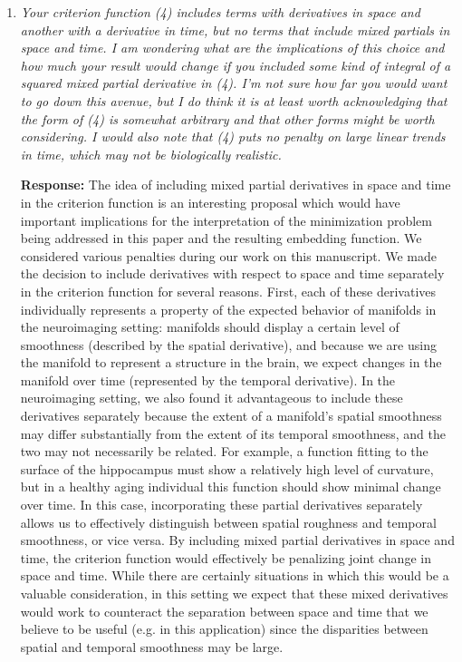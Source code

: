 \documentclass[12pt]{article}
\theoremstyle{definition}
\begin{document}
\begin{enumerate}
\item {\it Your criterion function (4) includes terms with derivatives in space and another with a derivative in time, but no terms that include mixed partials in space and time.  I am wondering what are the implications of this choice and how much your result would change if you included some kind of integral of a squared mixed partial derivative in (4).  I'm not sure how far you would want to go down this avenue, but I do think it is at least worth acknowledging that the form of (4) is somewhat arbitrary and that other forms might be worth considering.  I would also note that (4) puts no penalty on large linear trends in time, which may not be biologically realistic.}

{\bf Response:} The idea of including mixed partial derivatives in space and time in the criterion function is an interesting proposal which would have important implications for the interpretation of the minimization problem being addressed in this paper and the resulting embedding function. We considered various penalties during our work on this manuscript. We made the decision to include derivatives with respect to space and time separately in the criterion function for several reasons. First, each of these derivatives individually represents a property of the expected behavior of manifolds in the neuroimaging setting: manifolds should display a certain level of smoothness (described by the spatial derivative), and because we are using the manifold to represent a structure in the brain, we expect changes in the manifold over time (represented by the temporal derivative). In the neuroimaging setting, we also found it advantageous to include these derivatives separately because the extent of a manifold's spatial smoothness may differ substantially from the extent of its temporal smoothness, and the two may not necessarily be related. For example, a function fitting to the surface of the hippocampus must show a relatively high level of curvature, but in a healthy aging individual this function should show minimal change over time. In this case, incorporating these partial derivatives separately allows us to effectively distinguish between spatial roughness and temporal smoothness, or vice versa. By including mixed partial derivatives in space and time, the criterion function would effectively be penalizing joint change in space and time. While there are certainly situations in which this would be a valuable consideration, in this setting we expect that these mixed derivatives would work to counteract the separation between space and time that we believe to be useful (e.g. in this application) since the disparities between spatial and temporal smoothness may be large. 


\end{enumerate}
\end{document}
